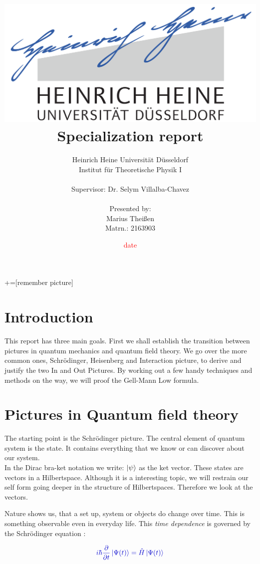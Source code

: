 \documentclass[12pt, titlepage]{article}
\title{\includegraphics[scale=0.07]{logo}\\Specialization report}
\date{\textcolor{red}{date}}
\author{ Heinrich Heine Universit\"at D\"usseldorf\\ Institut f\"ur Theoretische Physik I\\ \\ Supervisor:  Dr. Selym Villalba-Chavez \\\\Presented by:\\Marius Thei\ss{}en\\ Matrn.: 2163903 \\  }
\begin{document}
+=[remember picture]
\everymath{\displaystyle}

\maketitle %
\tableofcontents
\newpage
\section{Introduction}
This report has three main goals. First we shall establish the transition between pictures in quantum mechanics and quantum field theory. We go over the more common ones, Schrödinger, Heisenberg and Interaction picture, to derive and justify the two In and Out Pictures.
By working out a few handy techniques and methods on the way, we will proof the Gell-Mann Low formula.

\section{Pictures in Quantum field theory }
The starting point is the Schrödinger picture. The central element of quantum system is the state. It contains everything that we know or can discover about our system.
\\
In the Dirac bra-ket notation we write:  
$ \ket{\psi} $ 
as the ket vector. These states are vectors in a Hilbertspace. Although it is a interesting topic, we will restrain our self form going deeper in the structure of Hilbertspaces. Therefore we look at the vectors.


Nature shows us, that a set up, system or objects do change over time. This is something observable even in everyday life. This \textit{time dependence} is governed by the Schrödinger equation :

\begin{equation}\label{eq:schroedinger}
\textcolor[RGB]{0,0,204}{
i \hbar \frac{\partial }{\partial t} \ket{\Psi(t)} =
\hat{H} \ket{\Psi(t)}
}
\end{equation}
\end{document}
